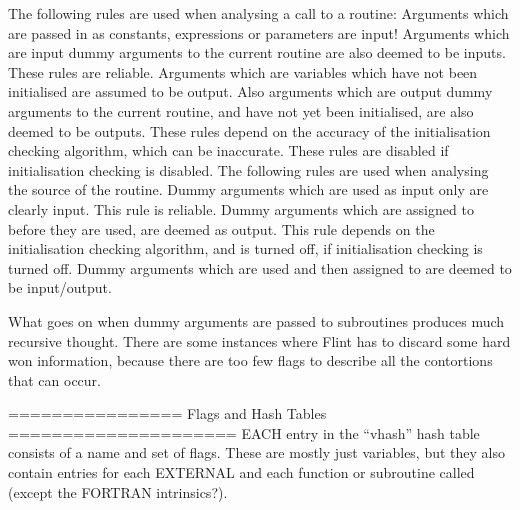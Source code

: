 {The following rules are used when analysing a call to a routine:
\newline\newline * Arguments which are passed in as constants, expressions or parameters
  are input! Arguments which are input dummy arguments to the current
  routine are also deemed to be inputs. These rules are reliable.
\newline\newline * Arguments which are variables which have not been initialised are
  assumed to be output. Also arguments which are output dummy arguments
  to the current routine, and have not yet been initialised, are also
  deemed to be outputs. These rules depend on the accuracy of the
  initialisation checking algorithm, which can be inaccurate. These
  rules are disabled if initialisation checking is disabled.
\newline\newline The following rules are used when analysing the source of the routine.
\newline\newline * Dummy arguments which are used as input only are clearly input. This rule is reliable.
\newline\newline * Dummy arguments which are assigned to before they are used, are 
  deemed as output. This rule depends on the initialisation checking 
  algorithm, and is turned off, if initialisation checking is turned 
  off.
\newline\newline * Dummy arguments which are used and then assigned to are deemed to
  be input/output. 

\newline\newline What goes on when dummy arguments are passed to subroutines produces 
much recursive thought. There are some instances where Flint has to 
discard some hard won information, because there are too few flags 
to describe all the contortions that can occur.

\newline\newline ================
\newline Flags and Hash Tables
\newline =====================
\newline EACH entry in the ``vhash'' hash table consists of a name and set of 
flags. These are mostly just variables, but they also contain entries 
for each EXTERNAL and each function or subroutine called (except the
FORTRAN intrinsics?).

}
